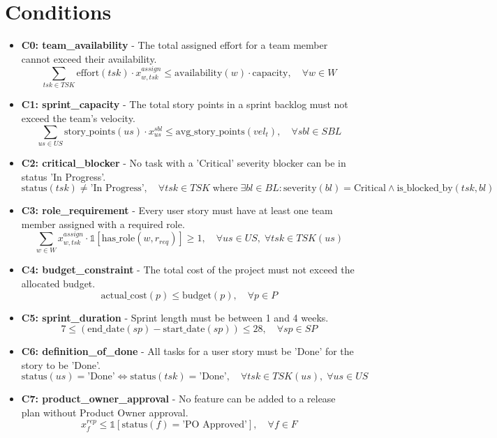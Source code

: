 \documentclass[11pt]{article}
\begin{document}
\section{Conditions}
\begin{itemize}
    \item \textbf{C0: team\_availability} - The total assigned effort for a team member cannot exceed their availability.
        \[ \sum_{tsk \in TSK} \text{effort}(tsk) \cdot x^{assign}_{w, tsk} \leq \text{availability}(w) \cdot \text{capacity}, \quad \forall w \in W \]

    \item \textbf{C1: sprint\_capacity} - The total story points in a sprint backlog must not exceed the team's velocity.
        \[ \sum_{us \in US} \text{story\_points}(us) \cdot x^{sbl}_{us} \leq \text{avg\_story\_points}(vel_t), \quad \forall sbl \in SBL \]

    \item \textbf{C2: critical\_blocker} - No task with a 'Critical' severity blocker can be in status 'In Progress'.
        \[ \text{status}(tsk) \neq \text{'In Progress'}, \quad \forall tsk \in TSK \; \text{where} \; \exists bl \in BL: \text{severity}(bl) = \text{Critical} \land \text{is\_blocked\_by}(tsk, bl) \]

    \item \textbf{C3: role\_requirement} - Every user story must have at least one team member assigned with a required role.
        \[ \sum_{w \in W} x^{assign}_{w, tsk} \cdot \mathbb{1}[\text{has\_role}(w, r_{req})] \geq 1, \quad \forall us \in US, \; \forall tsk \in TSK(us) \]

    \item \textbf{C4: budget\_constraint} - The total cost of the project must not exceed the allocated budget.
        \[ \text{actual\_cost}(p) \leq \text{budget}(p), \quad \forall p \in P \]

    \item \textbf{C5: sprint\_duration} - Sprint length must be between 1 and 4 weeks.
        \[ 7 \leq (\text{end\_date}(sp) - \text{start\_date}(sp)) \leq 28, \quad \forall sp \in SP \]

    \item \textbf{C6: definition\_of\_done} - All tasks for a user story must be 'Done' for the story to be 'Done'.
        \[ \text{status}(us) = \text{'Done'} \iff \text{status}(tsk) = \text{'Done'}, \quad \forall tsk \in TSK(us), \; \forall us \in US \]

    \item \textbf{C7: product\_owner\_approval} - No feature can be added to a release plan without Product Owner approval.
        \[ x^{rep}_f \leq \mathbb{1}[\text{status}(f) = \text{'PO Approved'}], \quad \forall f \in F \]


\end{itemize}
\end{document}
